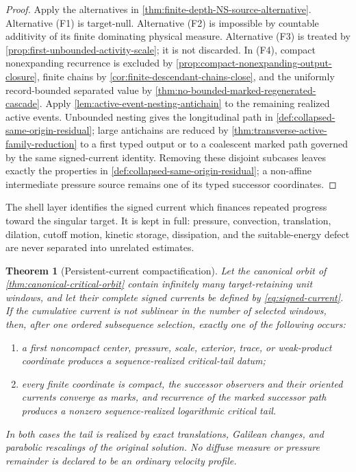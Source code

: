 \documentclass[11pt]{amsart}
\numberwithin{equation}{section}
\theoremstyle{plain}
\newtheorem{theorem}{Theorem}[section]
\theoremstyle{definition}
\theoremstyle{remark}
\begin{document}
\begin{proof}
Apply the alternatives in
\cref{thm:finite-depth-NS-source-alternative}.  Alternative \textup{(F1)} is
target-null.  Alternative \textup{(F2)} is impossible by countable
additivity of its finite dominating physical measure.  Alternative
\textup{(F3)} is treated by
\cref{prop:first-unbounded-activity-scale}; it is not discarded.  In
\textup{(F4)}, compact nonexpanding recurrence is excluded by
\cref{prop:compact-nonexpanding-output-closure}, finite chains by
\cref{cor:finite-descendant-chains-close}, and the uniformly record-bounded
separated value by
\cref{thm:no-bounded-marked-regenerated-cascade}.  Apply
\cref{lem:active-event-nesting-antichain} to the remaining realized active
events.  Unbounded nesting gives the longitudinal path in
\cref{def:collapsed-same-origin-residual}; large antichains are reduced by
\cref{thm:transverse-active-family-reduction} to a first typed output or to a
coalescent marked path governed by the same signed-current identity.  Removing
these disjoint subcases leaves exactly the properties in
\cref{def:collapsed-same-origin-residual}; a non-affine intermediate pressure
source remains one of its typed successor coordinates.
\end{proof}

The shell layer identifies the signed current which finances repeated progress
toward the singular target.  It is kept in full: pressure, convection,
translation, dilation, cutoff motion, kinetic storage, dissipation, and the
suitable-energy defect are never separated into unrelated estimates.

\begin{theorem}[Persistent-current compactification]
\label{thm:persistent-current-compactification}
Let the canonical orbit of \cref{thm:canonical-critical-orbit} contain
infinitely many target-retaining unit windows, and let their complete signed
currents be defined by \eqref{eq:signed-current}.  If the cumulative current
is not sublinear in the number of selected windows, then, after one ordered
subsequence selection, exactly one of the following occurs:
\begin{enumerate}[label=\textup{(\roman*)},leftmargin=2.2em]
\item a first noncompact center, pressure, scale, exterior, trace, or
weak-product coordinate produces a sequence-realized critical-tail datum;
\item every finite coordinate is compact, the successor observers and their
oriented currents converge as marks, and recurrence of the marked successor
path produces a nonzero sequence-realized logarithmic critical tail.
\end{enumerate}
In both cases the tail is realized by exact translations, Galilean changes,
and parabolic rescalings of the original solution.  No diffuse measure or
pressure remainder is declared to be an ordinary velocity profile.
\end{theorem}
\end{document}

